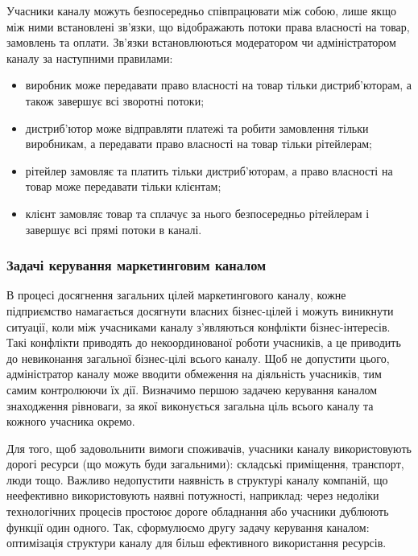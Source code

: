 Учасники каналу можуть безпосередньо співпрацювати між собою, лише якщо між ними встановлені зв’язки, що відображають потоки права власності на товар, замовлень та оплати. Зв’язки встановлюються модератором чи адміністратором каналу за наступними правилами:
\begin{itemize}
\item виробник може передавати право власності на товар тільки дистриб’юторам, а також завершує всі зворотні потоки;
\item дистриб’ютор може відправляти платежі та робити замовлення тільки виробникам, а передавати право власності на товар тільки рітейлерам;
\item рітейлер замовляє та платить тільки дистриб’юторам, а право власності на товар може передавати тільки клієнтам;
\item клієнт замовляє товар та сплачує за нього безпосередньо рітейлерам і завершує всі прямі потоки в каналі.
\end{itemize}

\subsubsection{Задачі керування маркетинговим каналом}

В процесі досягнення загальних цілей маркетингового каналу, кожне підприємство намагається досягнути власних бізнес-цілей і можуть виникнути ситуації, коли між учасниками каналу з’являються конфлікти бізнес-інтересів. Такі конфлікти приводять до некоординованої роботи учасників, а це приводить до невиконання загальної бізнес-цілі всього каналу. Щоб не допустити цього, адміністратор каналу може вводити обмеження на діяльність учасників, тим самим контролюючи їх дії. Визначимо першою задачею керування каналом знаходження рівноваги, за якої виконується загальна ціль всього каналу та кожного учасника окремо. 

Для того, щоб задовольнити вимоги споживачів, учасники каналу використовують дорогі ресурси (що можуть буди загальними): складські приміщення, транспорт, люди тощо. Важливо недопустити наявність в структурі каналу компаній, що неефективно використовують наявні потужності, наприклад: через недоліки технологічних процесів простоює дороге обладнання або учасники дублюють функції один одного. Так, сформулюємо другу задачу керування каналом: оптимізація структури каналу для більш ефективного використання ресурсів.
